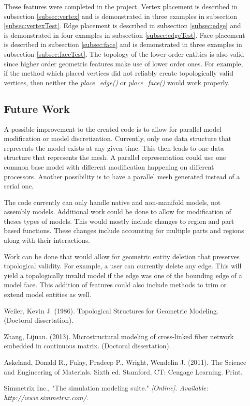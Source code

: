 \documentclass[a4paper, 12pt]{article}
\begin{document}
These features were completed in the project.
Vertex placement is described in subsection \ref{subsec:vertex}
and is demonstrated in three examples in subsection \ref{subsec:vertexTest}.
Edge placement is described in subsection \ref{subsec:edge}
and is demonstrated in four examples in subsection \ref{subsec:edgeTest}.
Face placement is described in subsection \ref{subsec:face}
and is demonstrated in three examples in subsection \ref{subsec:faceTest}.
The topology of the lower order entities is also valid since 
higher order geometric features make use of lower order ones.
For example, if the method which placed vertices did not reliably create
topologically valid vertices, then neither the \emph{place\_edge()} or 
\emph{place\_face()} would work properly. 

\subsection{Future Work} \label{subsec:future}
A possible improvement to the created code is to allow for parallel 
model modification or model discretization. Currently, only one
data structure that represents the model exists at any given time. 
This then leads to one data structure that represents the mesh. 
A parallel representation could use one common base model 
with different modification happening on different processors. 
Another possibility is to have a parallel mesh generated 
instead of a serial one.

The code currently can only handle native and non-manifold models, 
not assembly models. Additional work could be done to allow
for modification of theses types of models. This would mostly
include changes to region and part based functions. These changes 
include accounting for multiple parts and regions along with 
their interactions.

Work can be done that would allow for geometric entity deletion
that preserves topological validity. For example, a user can 
currently delete any edge. This will yield a topologically 
invalid model if the edge was one of the bounding edge of a 
model face. This addition of features could also
include methods to trim or extend model entities as well. 

\newpage
\begin{thebibliography}{99}

Weiler, Kevin J.
(1986).
Topological Structures for Geometric Modeling.
(Doctoral dissertation).

Zhang, Lijuan.
(2013).
Microstructural modeling of cross-linked 
fiber network embedded in continuous matrix.
(Doctoral dissertation).

Askeland, Donald R., Fulay, Pradeep P., Wright, Wendelin J.
(2011).
The Science and Engineering of Materials.
Sixth ed.
Stamford, CT: Cengage Learning.
Print.

Simmetrix Inc., 
"The simulation modeling suite."
\textit{[Online]. Available: http://www.simmetrix.com/.}

\end{thebibliography}
\end{document}
